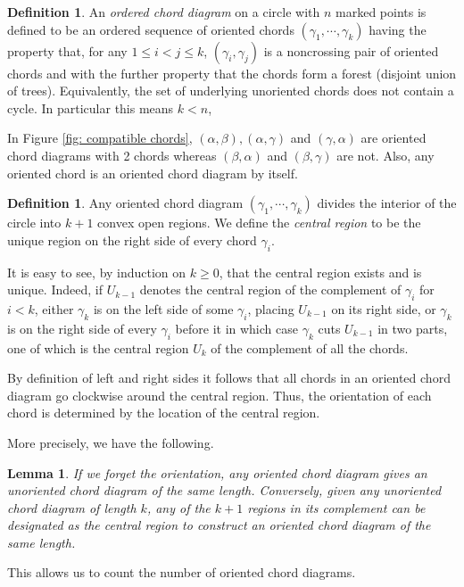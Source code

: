 \documentclass[11pt]{amsart}
\newtheorem{lem}[thm]{Lemma}
\theoremstyle{definition}
\newtheorem{defn}[thm]{Definition}
\theoremstyle{remark}
\numberwithin{equation}{section}
\begin{document}
\begin{defn}
An \emph{ordered chord diagram} on a circle with $n$ marked points is defined to be an ordered sequence of oriented chords $(\gamma_1,\cdots,\gamma_k)$ having the property that, for any $1\le i<j\le k$, $(\gamma_i,\gamma_j)$ is a noncrossing pair of oriented chords and with the further property that the chords form a forest (disjoint union of trees). Equivalently, the set of underlying unoriented chords does not contain a cycle. In particular this means $k<n$, 
\end{defn}

In Figure \ref{fig: compatible chords}, $(\alpha,\beta), (\alpha,\gamma)$ and $(\gamma,\alpha)$ are oriented chord diagrams with 2 chords whereas $(\beta,\alpha)$ and $(\beta,\gamma)$ are not. Also, any oriented chord is an oriented chord diagram by itself.

\begin{defn}\label{def: central region}
Any oriented chord diagram $(\gamma_1,\cdots,\gamma_k)$ divides the interior of the circle into $k+1$ convex open regions. We define the \emph{central region} to be the unique region on the right side of every chord $\gamma_i$. 
\end{defn}

It is easy to see, by induction on $k\ge0$, that the central region exists and is unique. Indeed, if $U_{k-1}$ denotes the central region of the complement of $\gamma_i$ for $i<k$, either $\gamma_k$ is on the left side of some $\gamma_i$, placing $U_{k-1}$ on its right side, or $\gamma_k$ is on the right side of every $\gamma_i$ before it in which case $\gamma_k$ cuts $U_{k-1}$ in two parts, one of which is the central region $U_k$ of the complement of all the chords.

By definition of left and right sides it follows that all chords in an oriented chord diagram go clockwise around the central region. Thus, the orientation of each chord is determined by the location of the central region. 


More precisely, we have the following.
\begin{lem}\label{lem: central region determines orientation}
If we forget the orientation, any oriented chord diagram gives an unoriented chord diagram of the same length. Conversely, given any unoriented chord diagram of length $k$, any of the $k+1$ regions in its complement can be designated as the central region to construct an oriented chord diagram of the same length.
\end{lem}
This allows us to count the number of oriented chord diagrams.
\end{document}
